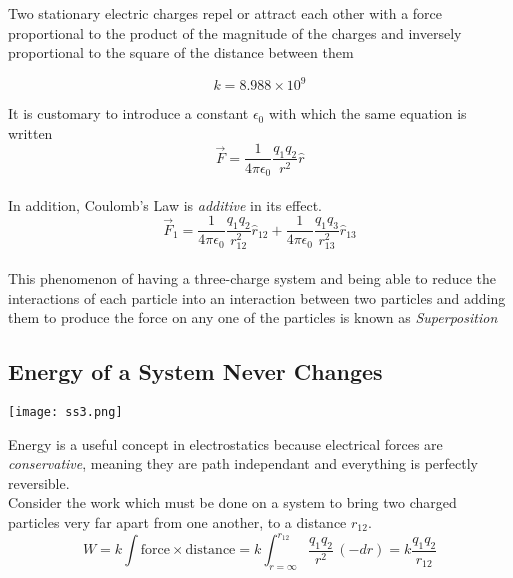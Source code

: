 \documentclass[svgnames]{article}
\begin{document}
Two stationary electric charges repel or attract each other with a force proportional to the product of the magnitude of the charges and inversely proportional to the square of the distance between them

\[ k = 8.988 \times 10^9 \] 
 
It is customary to introduce a constant $\epsilon_0$ with which the same equation is written \\ 

\[ \vec{F} = \frac{1}{4\pi \epsilon_0}\frac{q_1q_2}{r^2}\hat{r} \] \\

In addition, Coulomb's Law is \textit{additive} in its effect. \\

\[ \vec{F}_1 = \frac{1}{4\pi \epsilon_0}\frac{q_1q_2}{r_{12}^2}\hat{r}_{12} + \frac{1}{4\pi \epsilon_0}\frac{q_1q_3}{r_{13}^2}\hat{r}_{13} \] \\

This phenomenon of having a three-charge system and being able to reduce the interactions of each particle into an interaction between two particles and adding them to produce the force on any one of the particles is known as \textit{Superposition} 

\subsection{Energy of a System Never Changes}

\vspace{20px}

\begin{center}
\texttt{[image: ss3.png]}
\end{center} 


\vspace{20px}

Energy is a useful concept in electrostatics because electrical forces are \textit{conservative}, meaning they are path independant and everything is perfectly reversible. \\ 

Consider the work which must be done on a system to bring two charged particles very far apart from one another, to a distance $r_{12}$. \\

\[ W = k \int \text{force} \times \text{distance} = k\int_{r = \infty}^{r_{12}} \frac{q_1q_2}{r^2}\,(-dr) = k\frac{q_1q_2}{r_{12}} \] \\
\end{document}
